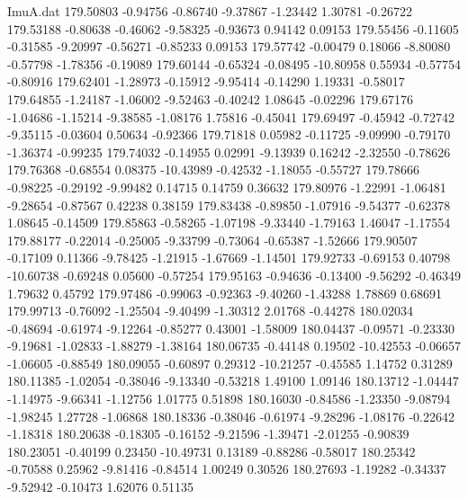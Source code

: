 \begin{filecontents}{ImuA.dat}
 179.50803   -0.94756   -0.86740   -9.37867   -1.23442    1.30781   -0.26722
 179.53188   -0.80638   -0.46062   -9.58325   -0.93673    0.94142    0.09153
 179.55456   -0.11605   -0.31585   -9.20997   -0.56271   -0.85233    0.09153
 179.57742   -0.00479    0.18066   -8.80080   -0.57798   -1.78356   -0.19089
 179.60144   -0.65324   -0.08495  -10.80958    0.55934   -0.57754   -0.80916
 179.62401   -1.28973   -0.15912   -9.95414   -0.14290    1.19331   -0.58017
 179.64855   -1.24187   -1.06002   -9.52463   -0.40242    1.08645   -0.02296
 179.67176   -1.04686   -1.15214   -9.38585   -1.08176    1.75816   -0.45041
 179.69497   -0.45942   -0.72742   -9.35115   -0.03604    0.50634   -0.92366
 179.71818    0.05982   -0.11725   -9.09990   -0.79170   -1.36374   -0.99235
 179.74032   -0.14955    0.02991   -9.13939    0.16242   -2.32550   -0.78626
 179.76368   -0.68554    0.08375  -10.43989   -0.42532   -1.18055   -0.55727
 179.78666   -0.98225   -0.29192   -9.99482    0.14715    0.14759    0.36632
 179.80976   -1.22991   -1.06481   -9.28654   -0.87567    0.42238    0.38159
 179.83438   -0.89850   -1.07916   -9.54377   -0.62378    1.08645   -0.14509
 179.85863   -0.58265   -1.07198   -9.33440   -1.79163    1.46047   -1.17554
 179.88177   -0.22014   -0.25005   -9.33799   -0.73064   -0.65387   -1.52666
 179.90507   -0.17109    0.11366   -9.78425   -1.21915   -1.67669   -1.14501
 179.92733   -0.69153    0.40798  -10.60738   -0.69248    0.05600   -0.57254
 179.95163   -0.94636   -0.13400   -9.56292   -0.46349    1.79632    0.45792
 179.97486   -0.99063   -0.92363   -9.40260   -1.43288    1.78869    0.68691
 179.99713   -0.76092   -1.25504   -9.40499   -1.30312    2.01768   -0.44278
 180.02034   -0.48694   -0.61974   -9.12264   -0.85277    0.43001   -1.58009
 180.04437   -0.09571   -0.23330   -9.19681   -1.02833   -1.88279   -1.38164
 180.06735   -0.44148    0.19502  -10.42553   -0.06657   -1.06605   -0.88549
 180.09055   -0.60897    0.29312  -10.21257   -0.45585    1.14752    0.31289
 180.11385   -1.02054   -0.38046   -9.13340   -0.53218    1.49100    1.09146
 180.13712   -1.04447   -1.14975   -9.66341   -1.12756    1.01775    0.51898
 180.16030   -0.84586   -1.23350   -9.08794   -1.98245    1.27728   -1.06868
 180.18336   -0.38046   -0.61974   -9.28296   -1.08176   -0.22642   -1.18318
 180.20638   -0.18305   -0.16152   -9.21596   -1.39471   -2.01255   -0.90839
 180.23051   -0.40199    0.23450  -10.49731    0.13189   -0.88286   -0.58017
 180.25342   -0.70588    0.25962   -9.81416   -0.84514    1.00249    0.30526
 180.27693   -1.19282   -0.34337   -9.52942   -0.10473    1.62076    0.51135

\end{filecontents}
